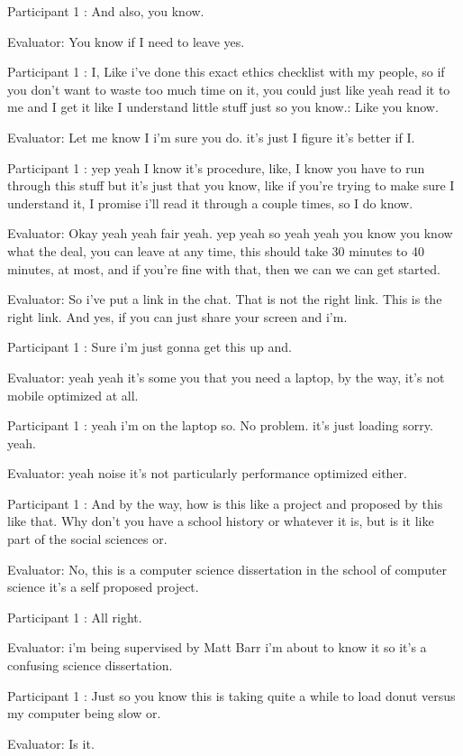 \documentclass{l4proj}
\begin{document}
\begin{appendices}
Participant 1 : And also, you know.

Evaluator: You know if I need to leave yes.

Participant 1 : I, Like i've done this exact ethics checklist with my people, so if you don't want to waste too much time on it, you could just like yeah read it to me and I get it like I understand little stuff just so you know.: Like you know.

Evaluator: Let me know I i'm sure you do. it's just I figure it's better if I.

Participant 1 : yep yeah I know it's procedure, like, I know you have to run through this stuff but it's just that you know, like if you're trying to make sure I understand it, I promise i'll read it through a couple times, so I do know.

Evaluator: Okay yeah yeah fair yeah. yep yeah so yeah yeah you know you know what the deal, you can leave at any time, this should take 30 minutes to 40 minutes, at most, and if you're fine with that, then we can we can get started.

Evaluator: So i've put a link in the chat. That is not the right link. This is the right link. And yes, if you can just share your screen and i'm.

Participant 1 : Sure i'm just gonna get this up and.

Evaluator: yeah yeah it's some you that you need a laptop, by the way, it's not mobile optimized at all.

Participant 1 : yeah i'm on the laptop so. No problem. it's just loading sorry. yeah.

Evaluator: yeah noise it's not particularly performance optimized either.

Participant 1 : And by the way, how is this like a project and proposed by this like that. Why don't you have a school history or whatever it is, but is it like part of the social sciences or.

Evaluator: No, this is a computer science dissertation in the school of computer science it's a self proposed project.

Participant 1 : All right.

Evaluator: i'm being supervised by Matt Barr i'm about to know it so it's a confusing science dissertation.

Participant 1 : Just so you know this is taking quite a while to load donut versus my computer being slow or.

Evaluator: Is it.


\end{appendices}
\end{document}

